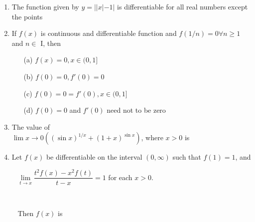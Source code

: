 \documentclass[journal,12pt,twocolumn]{IEEEtran}
\begin{document}
\begin{enumerate}
\item The function given by $y=||x|-1|$ is differentiable for all real numbers except the points
\begin{itemize}
\end{itemize}

\item If $f(x)$ is continuous and differentiable function and $f(1/n)=0 \forall n \geq 1$ and $n \in$ I, then
\begin{itemize}
\item[(a)] $f(x)=0, x\in (0,1]$
\item[(b)] $f(0)=0, f'(0)=0$
\item[(c)] $f(0)=0=f'(0), x \in (0,1]$
\item[(d)] $f(0)=0$ and $f'(0)$ need not to be zero
\end{itemize}

\item The value of \\$\lim\limits{x \to 0}\left((\sin x)^{1/x}+(1+x)^{\sin x}\right)$, where $x>0$ is
\begin{itemize}
\end{itemize}

\item Let $f(x)$ be differentiable on the interval $(0,\infty)$ such that $f(1)=1$, and \\ \item[~]$\lim\limits_{t \to x}\dfrac{t^2f(x)-x^2f(t)}{t-x}=1$ for each $x > 0$.\item[~] \item[~] Then $f(x)$ is
\begin{itemize}
\end{itemize}


\end{enumerate}
\end{document}
